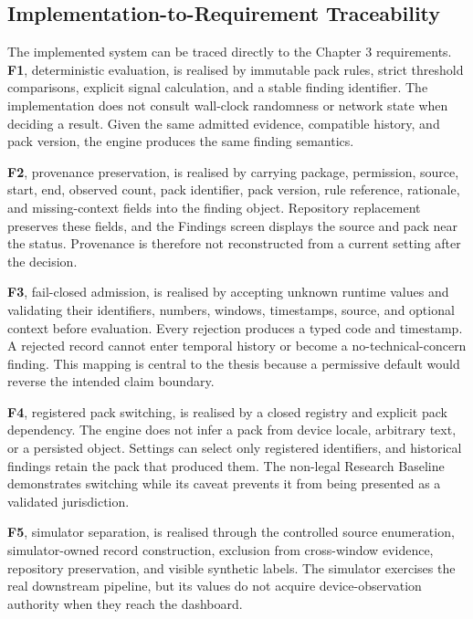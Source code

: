 \subsection{Implementation-to-Requirement Traceability}

The implemented system can be traced directly to the Chapter 3 requirements. \textbf{F1}, deterministic evaluation, is realised by immutable pack rules, strict threshold comparisons, explicit signal calculation, and a stable finding identifier. The implementation does not consult wall-clock randomness or network state when deciding a result. Given the same admitted evidence, compatible history, and pack version, the engine produces the same finding semantics.

\textbf{F2}, provenance preservation, is realised by carrying package, permission, source, start, end, observed count, pack identifier, pack version, rule reference, rationale, and missing-context fields into the finding object. Repository replacement preserves these fields, and the Findings screen displays the source and pack near the status. Provenance is therefore not reconstructed from a current setting after the decision.

\textbf{F3}, fail-closed admission, is realised by accepting unknown runtime values and validating their identifiers, numbers, windows, timestamps, source, and optional context before evaluation. Every rejection produces a typed code and timestamp. A rejected record cannot enter temporal history or become a no-technical-concern finding. This mapping is central to the thesis because a permissive default would reverse the intended claim boundary.

\textbf{F4}, registered pack switching, is realised by a closed registry and explicit pack dependency. The engine does not infer a pack from device locale, arbitrary text, or a persisted object. Settings can select only registered identifiers, and historical findings retain the pack that produced them. The non-legal Research Baseline demonstrates switching while its caveat prevents it from being presented as a validated jurisdiction.

\textbf{F5}, simulator separation, is realised through the controlled source enumeration, simulator-owned record construction, exclusion from cross-window evidence, repository preservation, and visible synthetic labels. The simulator exercises the real downstream pipeline, but its values do not acquire device-observation authority when they reach the dashboard.

